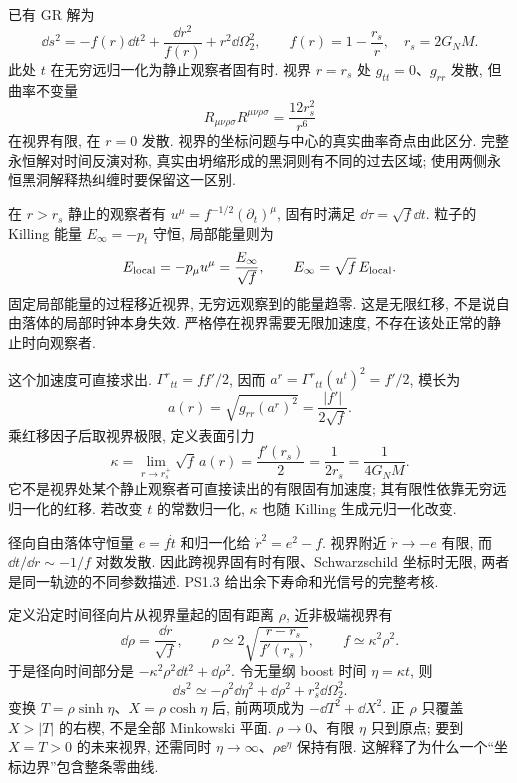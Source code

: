 已有 GR 解为
\[
\dd s^2=-f(r)\dd t^2+\frac{\dd r^2}{f(r)}+r^2\dd\Omega_2^2,
\qquad f(r)=1-\frac{r_s}r,\quad r_s=2G_NM.
\]
此处 $t$ 在无穷远归一化为静止观察者固有时. 视界 $r=r_s$ 处 $g_{tt}=0$、$g_{rr}$ 发散, 但曲率不变量
\[
R_{\mu\nu\rho\sigma}R^{\mu\nu\rho\sigma}
=\frac{12r_s^2}{r^6}
\]
在视界有限, 在 $r=0$ 发散. 视界的坐标问题与中心的真实曲率奇点由此区分. 完整永恒解对时间反演对称, 真实由坍缩形成的黑洞则有不同的过去区域; 使用两侧永恒黑洞解释热纠缠时要保留这一区别.

在 $r>r_s$ 静止的观察者有 $u^\mu=f^{-1/2}(\partial_t)^\mu$, 固有时满足 $\dd\tau=\sqrt f\dd t$. 粒子的 Killing 能量 $E_\infty=-p_t$ 守恒, 局部能量则为
\[
E_{\rm local}=-p_\mu u^\mu=\frac{E_\infty}{\sqrt f},
\qquad E_\infty=\sqrt f\,E_{\rm local}.
\]
固定局部能量的过程移近视界, 无穷远观察到的能量趋零. 这是无限红移, 不是说自由落体的局部时钟本身失效. 严格停在视界需要无限加速度, 不存在该处正常的静止时向观察者.

这个加速度可直接求出. $\Gamma^r{}_{tt}=ff'/2$, 因而 $a^r=\Gamma^r{}_{tt}(u^t)^2=f'/2$, 模长为
\[
a(r)=\sqrt{g_{rr}(a^r)^2}=\frac{|f'|}{2\sqrt f}.
\]
乘红移因子后取视界极限, 定义表面引力
\[
\kappa=\lim_{r\to r_s^+}\sqrt f\,a(r)
=\frac{f'(r_s)}2=\frac1{2r_s}=\frac1{4G_NM}.
\]
它不是视界处某个静止观察者可直接读出的有限固有加速度; 其有限性依靠无穷远归一化的红移. 若改变 $t$ 的常数归一化, $\kappa$ 也随 Killing 生成元归一化改变.

径向自由落体守恒量 $e=f\dot t$ 和归一化给 $\dot r^2=e^2-f$. 视界附近 $\dot r\to-e$ 有限, 而 $\dd t/\dd r\sim-1/f$ 对数发散. 因此跨视界固有时有限、Schwarzschild 坐标时无限, 两者是同一轨迹的不同参数描述. PS1.3 给出余下寿命和光信号的完整考核.

定义沿定时间径向片从视界量起的固有距离 $\rho$, 近非极端视界有
\[
\dd\rho=\frac{\dd r}{\sqrt f},\qquad
\rho\simeq2\sqrt{\frac{r-r_s}{f'(r_s)}},\qquad
f\simeq\kappa^2\rho^2.
\]
于是径向时间部分是 $-\kappa^2\rho^2\dd t^2+\dd\rho^2$. 令无量纲 boost 时间 $\eta=\kappa t$, 则
\[
\dd s^2\simeq-\rho^2\dd\eta^2+\dd\rho^2+r_s^2\dd\Omega_2^2.
\]
变换 $T=\rho\sinh\eta$、$X=\rho\cosh\eta$ 后, 前两项成为 $-\dd T^2+\dd X^2$. 正 $\rho$ 只覆盖 $X>|T|$ 的右楔, 不是全部 Minkowski 平面. $\rho\to0$、有限 $\eta$ 只到原点; 要到 $X=T>0$ 的未来视界, 还需同时 $\eta\to\infty$、$\rho\ee^\eta$ 保持有限. 这解释了为什么一个“坐标边界”包含整条零曲线.


